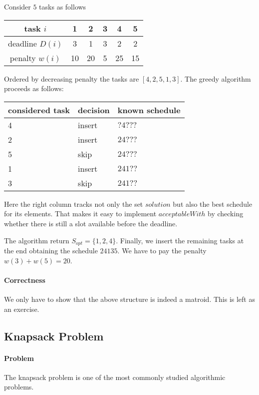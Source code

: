 \begin{example}
Consider $5$ tasks as follows
\begin{center}
\begin{tabular}{c|ccccc}
task $i$ & 1 & 2 & 3 & 4 & 5 \\
\hline
deadline $D(i)$ & 3 & 1 & 3 & 2 & 2 \\
penalty $w(i)$ & 10 & 20 & 5 & 25 & 15
\end{tabular}
\end{center}

Ordered by decreasing penalty the tasks are $[4,2,5,1,3]$.
The greedy algorithm proceeds as follows:
\begin{center}
\begin{tabular}{|lll|}
\hline
considered task & decision & known schedule \\
\hline
4 & insert & $?4???$ \\
2 & insert & $24???$ \\
5 & skip   & $24???$ \\
1 & insert & $241??$ \\
3 & skip   & $241??$ \\
\hline
\end{tabular}
\end{center}
Here the right column tracks not only the set $solution$ but also the best schedule for its elements.
That makes it easy to implement $acceptableWith$ by checking whether there is still a slot available before the deadline.

The algorithm return $S_{opt}=\{1,2,4\}$.
Finally, we insert the remaining tasks at the end obtaining the schedule $24135$.
We have to pay the penalty $w(3)+w(5)=20$.
\end{example}


\paragraph{Correctness}
We only have to show that the above structure is indeed a matroid.
This is left as an exercise.

\subsection{Knapsack Problem}\label{sec:ad:greedy:knapsack}

\paragraph{Problem}
The knapsack problem is one of the most commonly studied algorithmic problems.


